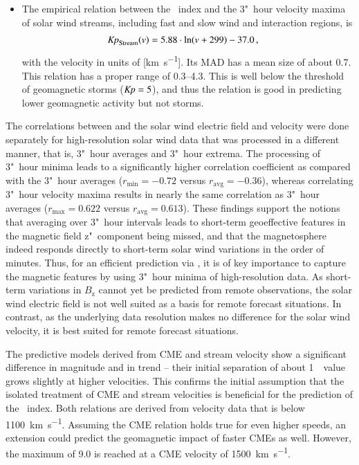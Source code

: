 \begin{itemize}
	\pagebreak

	\item The empirical relation between the \Kp~index and the 3"~hour velocity maxima of solar wind streams, including fast and slow wind and interaction regions, is
	\begin{align*}
		\text{\Kp}_\text{Stream}(v) &= 5.88 \cdot \ln(v + 299) - 37.0	\,,
	\end{align*}
	with the velocity in units of [\si{\km\per\s}]. Its MAD has a mean \Kp{} size of about \num{0.7}. This relation has a proper \Kp{} range of \numrange{0.3}{4.3}. This is well below the threshold of geomagnetic storms ($\si{\Kp} = 5$), and thus the relation is good in predicting lower geomagnetic activity but not storms.
\end{itemize}

\medskip

The correlations between \Kp{} and the solar wind electric field and velocity were done separately for high-resolution solar wind data that was processed in a different manner, that is, 3"~hour averages and 3"~hour extrema. The processing of 3"~hour \vBz{} minima leads to a significantly higher correlation coefficient as compared with the 3"~hour averages ($r_\text{min} = -0.72$ versus $r_\text{avg} = -0.36$), whereas correlating 3"~hour velocity maxima results in nearly the same correlation as 3"~hour averages ($r_\text{max} = 0.622$ versus $r_\text{avg} = 0.613$).
These findings support the notions that averaging over 3"~hour intervals leads to short-term geoeffective features in the magnetic field z"~component being missed, and that the magnetosphere indeed responds directly to short-term solar wind variations in the order of minutes. Thus, for an efficient \Kp{} prediction via \vBz{}, it is of key importance to capture the magnetic features by using 3"~hour minima of high-resolution data. As short-term variations in $B_\text{z}$ cannot yet be predicted from remote observations, the solar wind electric field is not well suited as a basis for remote forecast situations.
In contrast, as the underlying data resolution makes no difference for the solar wind velocity, it is best suited for remote forecast situations.

The \Kp{} predictive models derived from CME and stream velocity show a significant difference in magnitude and in trend -- their initial separation of about 1~\Kp~value grows slightly at higher velocities. This confirms the initial assumption that the isolated treatment of CME and stream velocities is beneficial for the prediction of the \Kp~index.
Both relations are derived from velocity data that is below \SI{1100}{\km\per\s}. Assuming the CME relation holds true for even higher speeds, an extension could predict the geomagnetic impact of faster CMEs as well. However, the maximum \Kp{} of \num{9.0} is reached at a CME velocity of \SI{1500}{\km\per\s}.

